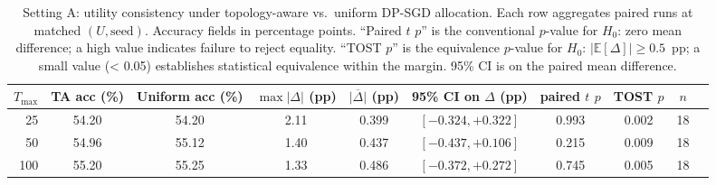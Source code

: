 \begin{table}[t]
\centering
\caption{Setting A: utility consistency under topology-aware vs.\ uniform DP-SGD allocation. Each row aggregates paired runs at matched $(U, \text{seed})$. Accuracy fields in percentage points. ``Paired $t$ $p$'' is the conventional $p$-value for $H_0$: zero mean difference; a high value indicates failure to reject equality. ``TOST $p$'' is the equivalence $p$-value for $H_0$: $|\mathbb{E}[\Delta]|\ge 0.5$~pp; a small value (< 0.05) establishes statistical equivalence within the margin. 95\% CI is on the paired mean difference.}
\label{tab:util-consistency-a}
\begin{tabular}{@{}rccccccccc@{}}
\toprule
$T_{\max}$ & TA acc (\%) & Uniform acc (\%) & $\max|\Delta|$ (pp) & $\overline{|\Delta|}$ (pp) & 95\% CI on $\Delta$ (pp) & paired $t$ $p$ & TOST $p$ & $n$ \\
\midrule
25 & 54.20 & 54.20 & 2.11 & 0.399 & $[-0.324, +0.322]$ & 0.993 & 0.002 & 18 \\
50 & 54.96 & 55.12 & 1.40 & 0.437 & $[-0.437, +0.106]$ & 0.215 & 0.009 & 18 \\
100 & 55.20 & 55.25 & 1.33 & 0.486 & $[-0.372, +0.272]$ & 0.745 & 0.005 & 18 \\
\bottomrule
\end{tabular}
\end{table}
